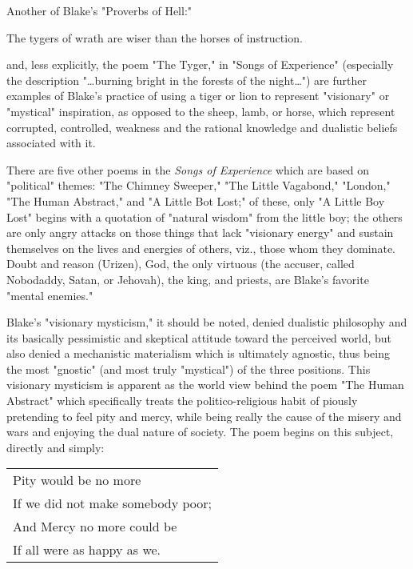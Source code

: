 \hspace*{5mm}Another of Blake's "Proverbs of Hell:"\par
\begin{center}
	\parbox{0.8\textwidth}{
		\centering
		The tygers of wrath are wiser than the horses of instruction.
	}%
\end{center}
and, less explicitly, the poem "The Tyger," in "Songs of Experience" (especially the description "\dots burning bright
in the forests of the night\dots") are further examples of Blake's practice of using a tiger or lion to represent "visionary"
or "mystical" inspiration, as opposed to the sheep, lamb, or horse, which represent corrupted, controlled, weakness and the rational
knowledge and dualistic beliefs associated with it.\par
\vspace*{0.5\baselineskip}
There are five other poems in the \textit{Songs of Experience} which are based on "political" themes: "The Chimney Sweeper,"
"The Little Vagabond," "London," "The Human Abstract," and "A Little Bot Lost;" of these, only "A Little Boy Lost" begins with a quotation of "natural wisdom"
from the little boy; the others are only angry attacks on those things that lack "visionary energy" and sustain themselves on the lives and energies of others, viz.,
those whom they dominate. Doubt and reason (Urizen), God, the only virtuous (the accuser, called Nobodaddy, Satan, or Jehovah), the king, and priests, are Blake's favorite "mental enemies."\par
\vspace*{0.5\baselineskip}
Blake's "visionary mysticism," it should be noted, denied dualistic philosophy and its basically pessimistic and skeptical attitude toward
the perceived world, but also denied a mechanistic materialism which is ultimately agnostic, thus being the most "gnostic" (and most truly "mystical") of
the three positions. This visionary mysticism is apparent as the world view behind the poem "The Human Abstract" which specifically treats the politico-religious habit of piously
pretending to feel pity and mercy, while being really the cause of the misery and wars and enjoying the dual nature of society. The poem begins on this subject, directly and simply:\par
\begin{center}
	\begin{tabular}{l}
		Pity would be no more             \\
		If we did not make somebody poor; \\
		And Mercy no more could be        \\
		If all were as happy as we.
	\end{tabular}
\end{center}
